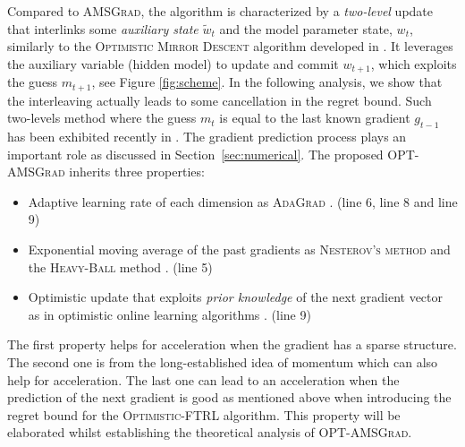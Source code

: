 \documentclass[11pt]{article}
\theoremstyle{k}
\begin{document}
Compared to \textsc{AMSGrad}, the algorithm is characterized by a \emph{two-level} update that interlinks some \emph{auxiliary state} $\tilde{w}_{t}$ and the model parameter state, $w_t$, similarly to the \textsc{Optimistic Mirror Descent} algorithm developed in \citep{rakhlin2013online}.
It leverages the auxiliary variable (hidden model) to update and commit $w_{t+1}$, which exploits the guess $m_{t+1}$, see Figure \ref{fig:scheme}.
In the following analysis, we show that the interleaving actually leads to some cancellation in the regret bound.
Such two-levels method where the guess $m_t$ is equal to the last known gradient $g_{t-1}$ has been exhibited recently in \citep{CJ12}.
The gradient prediction process plays an important role as discussed in Section~\ref{sec:numerical}.
The proposed \textsc{OPT-AMSGrad} inherits three properties:\vspace{-0.05in}
\begin{itemize}
\item Adaptive learning rate of each dimension as \textsc{AdaGrad} \citep{DHS11}. (line 6, line 8 and line 9)
\item Exponential moving average of the past gradients as \textsc{Nesterov's method} \citep{N04} and the \textsc{Heavy-Ball} method \citep{P64}. (line 5)
\item Optimistic update that exploits \emph{prior knowledge} of the next gradient vector as in optimistic online learning algorithms \citep{CJ12,rakhlin2013online,SALS15}. (line 9)
\end{itemize}\vspace{-0.05in}
The first property helps for acceleration when the gradient has a sparse structure.
The second one is from the long-established idea of momentum which can also help for acceleration. 
The last one can lead to an acceleration when the prediction of the next gradient is good as mentioned above when introducing the regret bound for the \textsc{Optimistic-FTRL} algorithm.
This property will be elaborated whilst establishing the theoretical analysis of \textsc{OPT-AMSGrad}.
\end{document}

